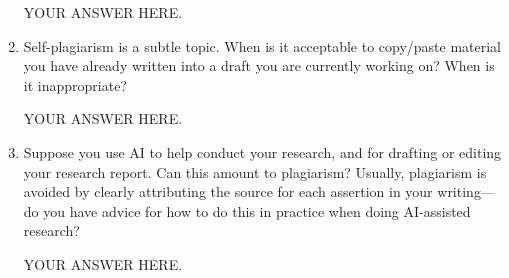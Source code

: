 \documentclass[12pt]{article}
\begin{document}
\begin{enumerate}
YOUR ANSWER HERE.

\item Self-plagiarism is a subtle topic. When is it acceptable to copy/paste material you have already written into a draft you are currently working on? When is it inappropriate?

YOUR ANSWER HERE.

\item Suppose you use AI to help conduct your research, and for drafting or editing your research report. Can this amount to plagiarism? Usually, plagiarism is avoided by clearly attributing the source for each assertion in your writing---do you have advice for how to do this in practice when doing AI-assisted research?

YOUR ANSWER HERE.

\end{enumerate}
\end{document}
